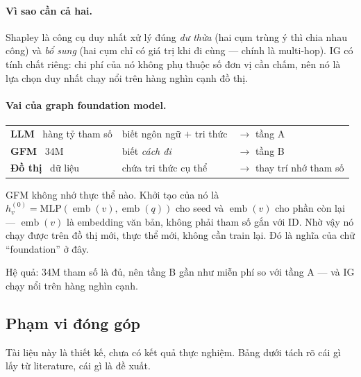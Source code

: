 \documentclass[11pt,a4paper]{article}
\DeclareMathOperator{\emb}{emb}
\begin{document}
\paragraph{Vì sao cần cả hai.}
Shapley là công cụ duy nhất xử lý đúng \emph{dư thừa} (hai cụm trùng ý thì chia nhau công) và \emph{bổ sung} (hai cụm chỉ có giá trị khi đi cùng --- chính là multi-hop). IG có tính chất riêng: chi phí của nó không phụ thuộc số đơn vị cần chấm, nên nó là lựa chọn duy nhất chạy nổi trên hàng nghìn cạnh đồ thị.

\paragraph{Vai của graph foundation model.}

\begin{center}
\begin{tabular}{@{}lll@{}}
\toprule
\textbf{LLM} \ {\footnotesize hàng tỷ tham số} & biết ngôn ngữ $+$ tri thức & $\to$ tầng A \\
\textbf{GFM} \ {\footnotesize 34M} & biết \emph{cách đi} & $\to$ tầng B \\
\textbf{Đồ thị} \ {\footnotesize dữ liệu} & chứa tri thức cụ thể & $\to$ thay trí nhớ tham số \\
\bottomrule
\end{tabular}
\end{center}

GFM không nhớ thực thể nào. Khởi tạo của nó là $h_v^{(0)}=\mathrm{MLP}(\emb(v),\emb(q))$ cho seed và $\emb(v)$ cho phần còn lại --- $\emb(v)$ là embedding văn bản, không phải tham số gắn với ID. Nhờ vậy nó chạy được trên đồ thị mới, thực thể mới, không cần train lại. Đó là nghĩa của chữ ``foundation'' ở đây.

Hệ quả: 34M tham số là đủ, nên tầng B gần như miễn phí so với tầng A --- và IG chạy nổi trên hàng nghìn cạnh.


\subsection*{Phạm vi đóng góp}

Tài liệu này là thiết kế, chưa có kết quả thực nghiệm. Bảng dưới tách rõ cái gì
lấy từ literature, cái gì là đề xuất.
\end{document}
